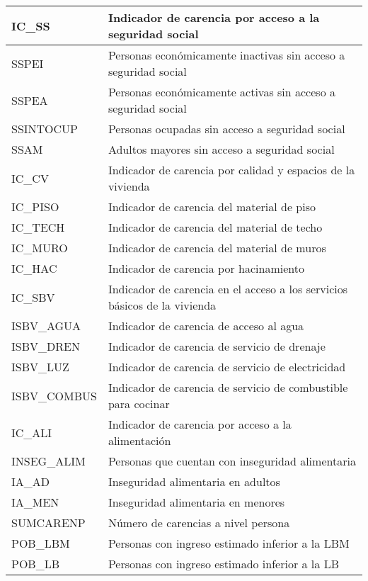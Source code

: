 \begin{longtable}{|p{8cm}|p{8cm}|}
    \hline
    IC\_SS & Indicador de carencia por acceso a la seguridad social \\
    \hline
    SSPEI & Personas económicamente inactivas sin acceso a seguridad social \\
    \hline
    SSPEA & Personas económicamente activas sin acceso a seguridad social \\
    \hline
    SSINTOCUP & Personas ocupadas sin acceso a seguridad social \\
    \hline
    SSAM & Adultos mayores sin acceso a seguridad social\\
    \hline
    IC\_CV & Indicador de carencia por calidad y espacios de la vivienda \\
    \hline
    IC\_PISO & Indicador de carencia del material de piso \\
    \hline
    IC\_TECH & Indicador de carencia del material de techo \\
    \hline
    IC\_MURO & Indicador de carencia del material de muros \\
    \hline
    IC\_HAC & Indicador de carencia por hacinamiento \\
    \hline
    IC\_SBV & Indicador de carencia en el acceso a los servicios básicos de la vivienda \\
    \hline
    ISBV\_AGUA & Indicador de carencia de acceso al agua \\
    \hline
    ISBV\_DREN & Indicador de carencia de servicio de drenaje \\
    \hline
    ISBV\_LUZ & Indicador de carencia de servicio de electricidad \\
    \hline
    ISBV\_COMBUS & Indicador de carencia de servicio de combustible para cocinar \\
    \hline
    IC\_ALI & Indicador de carencia por acceso a la alimentación \\
    \hline
    INSEG\_ALIM & Personas que cuentan con inseguridad alimentaria \\
    \hline
    IA\_AD & Inseguridad alimentaria en adultos \\
    \hline
    IA\_MEN & Inseguridad alimentaria en menores \\
    \hline
    SUMCARENP & Número de carencias a nivel persona \\
    \hline
    POB\_LBM & Personas con ingreso estimado inferior a la LBM \\
    \hline
    POB\_LB & Personas con ingreso estimado inferior a la LB \\
    \hline
    \hline




\end{longtable}
\label{tab:varsocioe}

